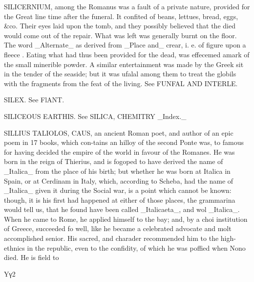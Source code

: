 SILICERNIUM, among the Romanus was a fault of a private nature, provided for the Great line time after the funeral. It confited of beans, lettues, bread, eggs, \&co. Their eyes laid upon the tomb, and they possibly believed that the died would come out of the repair. What was left was generally burnt on the floor. The word \_Alternate\_ as derived from \_Place and\_ crear, i. e. of figure upon a fleece . Eating what had thus been provided for the dead, was effecemed amark of the small minerible powder. A similar entertainment was made by the Greek sit in the tender of the seaside; but it was ufalal among them to treat the globils with the fragments from the feat of the living. See FUNFAL AND INTERLE.\par\medskip
SILEX. See FlANT.\par\medskip
SILICEOUS EARTHIS. See SILICA, CHEMITRY \_Index.\_\par\medskip
SILLIUS TALIOLOS, CAUS, an ancient Roman poet, and author of an epic poem in 17 books, which con-tains an hilloy of the second Ponte was, to famous for having decided the empire of the world in favour of the Romanes. He was born in the reign of Thierius, and is fogoped to have derived the name of \_Italica\_ from the place of his birth; but whether he was born at Italica in Spain, or at Cerdinam in Italy, which, according to Scheba, had the name of \_Italica\_ given it during the Social war, is a point which cannot be known: though, it is his first had happened at either of those places, the grammarina would tell us, that he found have been called \_Italicaeta\_, and wol \_Italica\_. When he came to Rome, he applied himself to the bay; and, by a choi institution of Greece, succeeded fo well, like he became a celebrated advocate and molt accomplished senior. His sacred, and charader recommended him to the high- ethnics in the republic, even to the confidity, of which he was poffied when Nono died. He is field to\par\medskip
Yγ2\par\medskip

